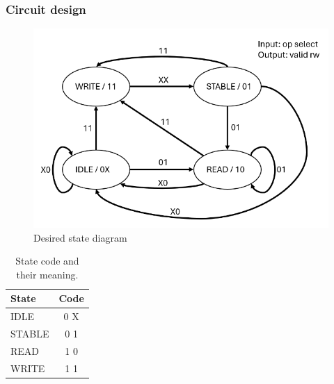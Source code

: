 \subsubsection{Circuit design}




\begin{figure}
    \centering
    \includegraphics[width=0.7\linewidth]{LaTeX_2/Figures/state_diagram.png}
    \caption{Desired state diagram \cite{oppgavebeskrivelse}}
    \label{fig:03:state_diagram}
\end{figure}

\begin{table}[]
    \label{tab:03:state_code}
    \caption{State code and their meaning.}
    \centering
    \begin{tabular}{|l|c|}
        \hline
        State   &   Code    \\  \hline
        IDLE    &   0 X     \\  
        STABLE  &   0 1     \\
        READ    &   1 0     \\
        WRITE   &   1 1     \\  \hline
    \end{tabular}
\end{table}


